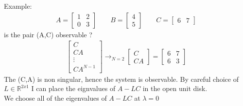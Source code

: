 \documentclass[a4paper,11pt]{article}
\begin{document}
	Example:
	\begin{gather}
		A = 
		\begin{bmatrix}
			1 & 2\\
			0 & 3 
		\end{bmatrix}
		\qquad
		B = 
		\begin{bmatrix}
			4 \\
			5
		\end{bmatrix}
		\qquad 
		C = 
		\begin{bmatrix}
		 	6 & 7 
		\end{bmatrix}
	\end{gather}
	is the pair (A,C) observable ?\\
	\begin{gather}
		\begin{bmatrix}
			C\\
			CA\\
			\vdots\\
			CA^{N-1}
		\end{bmatrix}\rightarrow_{N=2}
		\begin{bmatrix}
		C\\CA
		\end{bmatrix}=
		\begin{bmatrix}
			6 & 7\\
			6 & 3
		\end{bmatrix}		
	\end{gather}
	The (C,A) is non singular, hence the system is observable. By careful choice of $L\in \mathbb{R}^{2x1}$ I can place the eignvalues of $A-LC$ in the open unit disk.\\

	We choose all of the eigenvalues of $A-LC$ at $\lambda = 0$\\
\end{document}
